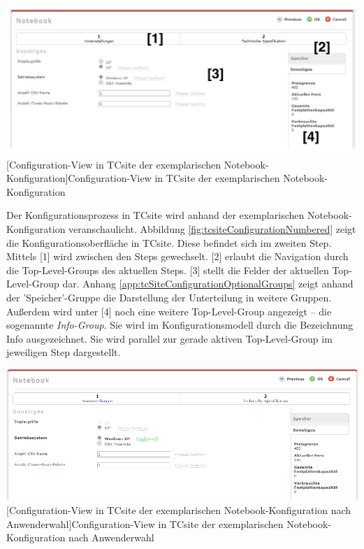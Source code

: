 \documentclass[11pt, a4paper, titlepage, listof=totoc, bibliography=totoc, index=totoc, twoside, openright, headings=normal]{scrreprt}
\begin{document}
\vspace{1em}
\begin{minipage}{\linewidth}
	\centering
	\includegraphics[width=1\linewidth]{Abbildungen/tcsiteConfigurationNumbered.pdf}
	[Configuration-View in TCsite der exemplarischen Notebook-Konfiguration]{Configuration-View in TCsite der exemplarischen Notebook-Konfiguration}
	\label{fig:tcsiteConfigurationNumbered}
\end{minipage}
\vspace{0.3em}

Der Konfigurationsprozess in TCsite wird anhand der exemplarischen Notebook-Konfiguration veranschaulicht. Abbildung \ref{fig:tcsiteConfigurationNumbered} zeigt die Konfigurationsoberfläche in TCsite. Diese befindet sich im zweiten Step. Mittels [1] wird zwischen den Steps gewechselt. [2] erlaubt die Navigation durch die Top-Level-Groups des aktuellen Steps. [3] stellt die Felder der aktuellen Top-Level-Group dar. Anhang \ref{app:tcSiteConfigurationOptionalGroups} zeigt anhand der 'Speicher'-Gruppe die Darstellung der Unterteilung in weitere Gruppen. Außerdem wird unter [4] noch eine weitere Top-Level-Group angezeigt -- die sogenannte \emph{Info-Group}. Sie wird im Konfigurationsmodell durch die Bezeichnung \glqq Info\grqq{} ausgezeichnet. Sie wird parallel zur gerade aktiven Top-Level-Group im jeweiligen Step dargestellt.

\vspace{1em}
\begin{minipage}{\linewidth}
	\centering
	\includegraphics[width=1\linewidth]{Abbildungen/tcsiteConfigurationChoice.PNG}
	[Configuration-View in TCsite der exemplarischen Notebook-Konfiguration nach Anwenderwahl]{Configuration-View in TCsite der exemplarischen Notebook-Konfiguration nach Anwenderwahl}
	\label{fig:tcsiteConfigurationChoice}
\end{minipage}
\vspace{0.3em}
\end{document}
